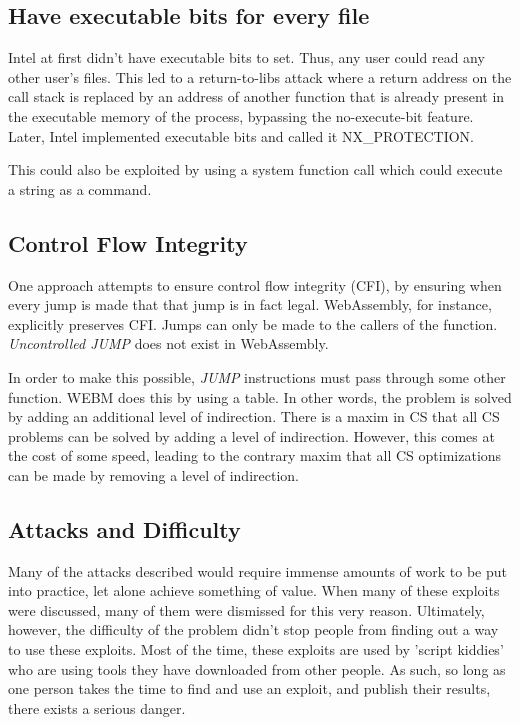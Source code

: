 \documentclass[twoside]{article}
\begin{document}
\subsection{Have executable bits for every file}
Intel at first didn't have executable bits to set. Thus, any user could read any other user's files. This led to a return-to-libs attack where a return address on the call stack is replaced by an address of another function that is already present in the executable memory of the process, bypassing the no-execute-bit feature. Later, Intel implemented executable bits and called it NX\_PROTECTION.

This could also be exploited by using a system function call which could execute a string as a command.

\subsection{Control Flow Integrity}
One approach attempts to ensure control flow integrity (CFI), by ensuring when every jump is made that that jump is in fact legal. WebAssembly, for instance, explicitly preserves CFI. Jumps can only be made to the callers of the function. \textit{Uncontrolled JUMP} does not exist in WebAssembly.

In order to make this possible, \textit{JUMP} instructions must pass through some other function. WEBM does this by using a table. In other words, the problem is solved by adding an additional level of indirection. There is a maxim in CS that all CS problems can be solved by adding a level of indirection. However, this comes at the cost of some speed, leading to the contrary maxim that all CS optimizations can be made by removing a level of indirection.

\subsection{Attacks and Difficulty}
Many of the attacks described would require immense amounts of work to be put into practice, let alone achieve something of value. When many of these exploits were discussed, many of them were dismissed for this very reason. Ultimately, however, the difficulty of the problem didn't stop people from finding out a way to use these exploits. Most of the time, these exploits are used by 'script kiddies' who are using tools they have downloaded from other people. As such, so long as one person takes the time to find and use an exploit, and publish their results, there exists a serious danger.
\end{document}
